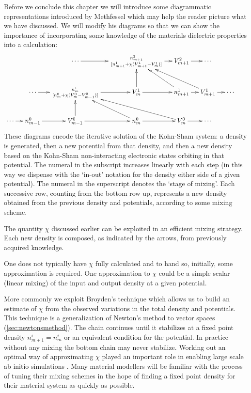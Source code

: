 Before we conclude this chapter we will introduce some diagrammatic representations introduced
by Methfessel which may help the reader picture what we have discussed\cite{methfessel95}.
We will modify his diagrams so that we can show the importance of incorporating some knowledge of 
the materials dielectric properties into a calculation:
%
\begin{displaymath} 
\xymatrixcolsep{4mm}
\xymatrix{
	&             &                     \cdots \ar[r]     &       n^{2}_{m+1} \atop [n^{1}_{m+1} + \chi(V^{1}_{m+1} - V^{1}_{m})] \ar[r]  & V^{2}_{m+1} \ar[r] & \cdots & &\\
	&              \cdots \ar[r] &  n^{1}_{m} \atop  [n^{0}_{m} + \chi(V^{0}_{m} - V^{0}_{m-1})] \ar[r]  & V^{1}_{m} \ar[r] \ar[u] & n^{1}_{m+1} \ar[ul] \ar[r] & V^{1}_{m+1} \ar[ull] \ar[r] & \cdots &    \\
\cdots \ar[r] & n^{0}_{m-1} \ar[r] & V^{0}_{m-1} \ar[u] \ar[r] & n^{0}_{m}\ar[ul] \ar[r] & V^{0}_{m} \ar[ull] \ar[r] & \cdots &  & \\
%
}
\end{displaymath}
%
These diagrams encode the iterative solution of the Kohn-Sham system: a density is generated, then
a new potential from that density, and then a new density based on the Kohn-Sham non-interacting electronic states
orbiting in that potential. The numeral in the subscript increases linearly with each step (in this way we dispense with the
`in-out' notation for the density either side of a given potential). The numeral in the superscript 
denotes the `stage of mixing'.
Each successive row, counting from the bottom row up, represents a new density obtained from the previous density and potentials, 
according to some mixing scheme. 

The quantity $\chi$ discussed earlier can be exploited in 
an efficient mixing strategy. Each new density is composed, as indicated by the arrows, 
from previously acquired knowledge.

One does not typically have $\chi$
fully calculated and to hand so, initially, some approximation is required.
One approximation to $\chi$ could be a simple 
scalar (linear mixing) of the input and output density at a given potential. 

More commonly we exploit Broyden's technique which allows us to build an estimate of $\chi$
from the observed variations in the total density and potentials. This technique is a generalization
of Newton's method to vector spaces (\ref{sec:newtonsmethod}).
The chain continues until it stabilizes at a fixed point density 
$n^{i}_{m+1}=n^{i}_{m}$ or an equivalent condition for the potential.
In practice without any mixing the bottom chain may never stabilize. 
Working out an optimal way of approximating $\chi$ played an important role
in enabling large scale ab initio simulations \cite{vanderbilt84, johnson88}.
Many material modellers will be familiar with the process of tuning their mixing schemes 
in the hope of finding a fixed point density for their material system as quickly as possible. 

